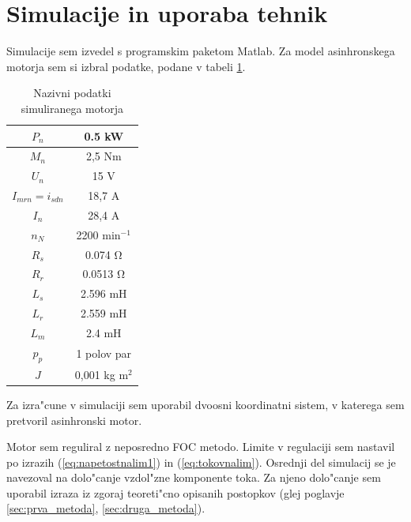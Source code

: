 \documentclass[journal,a4paper,twoside]{sty/IEEEtran}
\begin{document}
\section{Simulacije in uporaba tehnik}
Simulacije sem izvedel s programskim paketom Matlab. 
Za model asinhronskega motorja sem si izbral podatke, podane v tabeli \ref{tab:nazivni_podatki_motorja}.
\begin{table}[h!]
\centering
\caption{Nazivni podatki simuliranega motorja}
\label{tab:nazivni_podatki_motorja}
\begin{tabular}{|c|c|}
\hline
	$P_n$		&0.5 kW \\\hline
	$M_n$		&2,5 Nm \\\hline
	$U_n$		&	15 V\\\hline
	$I_{mrn}= i_{sdn}$&	18,7 A\\\hline
	$I_n $		&	28,4 A\\\hline
	$n_N $		&	2200 min$^{-1}$\\\hline
	$R_s$		&	0.074 $\mathrm{\Omega}$\\\hline
	$R_r$		&	0.0513 $\mathrm{\Omega}$\\\hline
	$L_s $		&	2.596 mH\\\hline
	$L_r $		&	2.559 mH\\\hline
	$L_m $		&	2.4 mH\\\hline
	$p_p $		& 	1 polov par	\\\hline
	$J$			&	0,001 kg $\mathrm{m}^2$	\\\hline										
\end{tabular}
\end{table}



Za izra"cune v simulaciji sem uporabil dvoosni koordinatni sistem, v katerega sem pretvoril asinhronski motor.




Motor sem reguliral z neposredno FOC metodo. Limite v regulaciji sem nastavil po izrazih  (\ref{eq:napetostnalim1}) in (\ref{eq:tokovnalim}).
Osrednji del simulacij se je navezoval na dolo"canje vzdol"zne komponente toka. Za njeno dolo"canje sem uporabil izraza iz zgoraj teoreti"cno opisanih postopkov (glej poglavje \ref{sec:prva_metoda}, \ref{sec:druga_metoda}).
\end{document}
